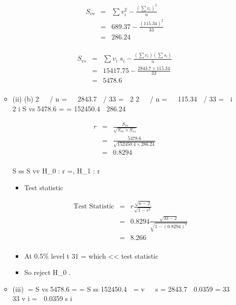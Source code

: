 \documentclass[a4paper,12pt]{article}
\begin{document}
\begin{enumerate}
\begin{itemize}
\begin{eqnarray*}
S_{vv} &=& \sum v_i^2 - \frac{(\sum v_i)^2 }{n} \\&=& 689.37 - \frac{(115.34 )^2}{33} \\
&=& 286.24 \\
\end{eqnarray*}



\begin{eqnarray*}
S_{vs} &=& \sum v_i\;s_i - \frac{(\sum v_i)(\sum s_i) }{n} \\
&=& 15417.75 - \frac{2843.7 \times  115.34 }{33} \\
&=& 5478.6\\
\end{eqnarray*}

\item (ii)
(b)
2 
 / n \;=   2843.7  / 33 \;=

2
2 
 / n \;=   115.34  / 33 \;=

i
2
i
S vs
5478.6
\;=\;
\;=
152450.4  286.24

\begin{eqnarray*}
r &=&  \frac{S_{vs}}{\sqrt{S_{vv} \times S_{ss} } }\\
&=& \frac{5478.6}{\sqrt{152450.4 \times 286.24 }}\\
&=& 0.8294\\
\end{eqnarray*}

S ss S vv
H_0 : r \;=, H_{1} : r 

\begin{itemize}
    \item Test statistic 
    
\begin{eqnarray*} 
\mbox{Test Statistic} &=& r \frac{ \sqrt{n-2} }{\sqrt{1-r^2}} \\
&=& 0.8294 \frac{ \sqrt{33-2} }{\sqrt{1-(0.8294)^2}} \\
&=& 8.266 \\
\end{eqnarray*}

\item At 0.5\% level t 31 \;= which << test statistic
\item So reject H_0 .
\end{itemize}
\item (iii)
\;=\;
S vs
5478.6
\;=\;
\;=
S ss 152450.4
 \;=\; v   s \;=
2843.7
 0.0359
\;=
33
33
v i \;=  0.0359 s i


\end{itemize}
\end{enumerate}
\end{document}
